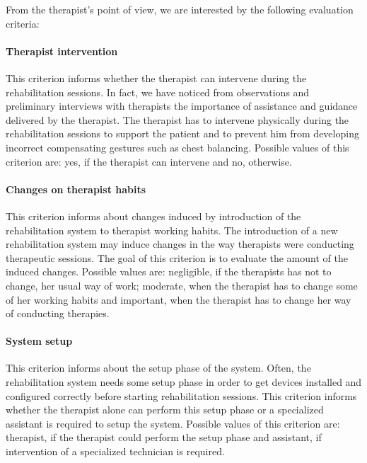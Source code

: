 \documentclass[preprint,authoryear,12pt]{elsarticle}
\begin{document}
From the therapist's point of view, we are interested by the following evaluation criteria:
\par
\paragraph{Therapist intervention}
\par
This criterion informs whether the therapist can intervene during the rehabilitation sessions. In fact, we have noticed from observations and preliminary interviews with therapists the importance of assistance and guidance delivered by the therapist. The therapist has to intervene physically during the rehabilitation sessions to support the patient and to prevent him from developing incorrect compensating gestures such as chest balancing. Possible values of this criterion are: yes, if the therapist can intervene and no, otherwise.
\par
\paragraph{Changes on therapist habits}
\par
This criterion informs about changes induced by introduction of the rehabilitation system to therapist working habits. The introduction of a new rehabilitation system may induce changes in the way therapists were conducting therapeutic sessions. The goal of this criterion is to evaluate the amount of the induced changes. Possible values are: negligible, if the therapists has not to change, her usual way of work; moderate, when the therapist has to change some of her working habits and important, when the therapist has to change her way of conducting therapies.  
\par
\paragraph{System setup}
\par
This criterion informs about the setup phase of the system. Often, the rehabilitation system needs some setup phase in order to get devices installed and configured correctly before starting rehabilitation sessions. This criterion informs whether the therapist alone can perform this setup phase or a specialized assistant is required to setup the system. Possible values of this criterion are: therapist, if the therapist could perform the setup phase and assistant, if intervention of a specialized technician is required.
\par
\end{document}
